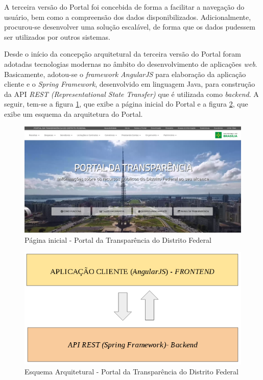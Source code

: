 A terceira versão do Portal foi concebida de forma a facilitar a navegação do usuário, bem como a compreensão dos dados disponibilizados. Adicionalmente, procurou-se desenvolver uma solução escalável, de forma que os dados pudessem ser utilizados por outros sistemas.

Desde o início da concepção arquitetural da terceira versão do Portal foram adotadas tecnologias modernas no âmbito do desenvolvimento de aplicações \textit{web}. Basicamente, adotou-se o \textit{framework AngularJS} para elaboração da aplicação cliente e o \textit{Spring Framework}, desenvolvido em linguagem Java, para construção da API \textit{REST (Representational State Transfer)} que é utilizada como \textit{backend}. A seguir, tem-se a figura \ref{fig:portalInicio}, que exibe a página inicial do Portal e a figura \ref{fig:arquiteturaPortal}, que exibe um esquema da arquitetura do Portal.

\begin{figure}[h]
\includegraphics[width=\textwidth]{figuras/portalTransparencia.png}
\caption{Página inicial - Portal da Transparência do Distrito Federal}
\label{fig:portalInicio}
\end{figure}

\begin{figure}[h]
\includegraphics[width=\textwidth]{figuras/arquiteturaPortal.png}
\caption{Esquema Arquitetural - Portal da Transparência do Distrito Federal}
\label{fig:arquiteturaPortal}
\end{figure}

